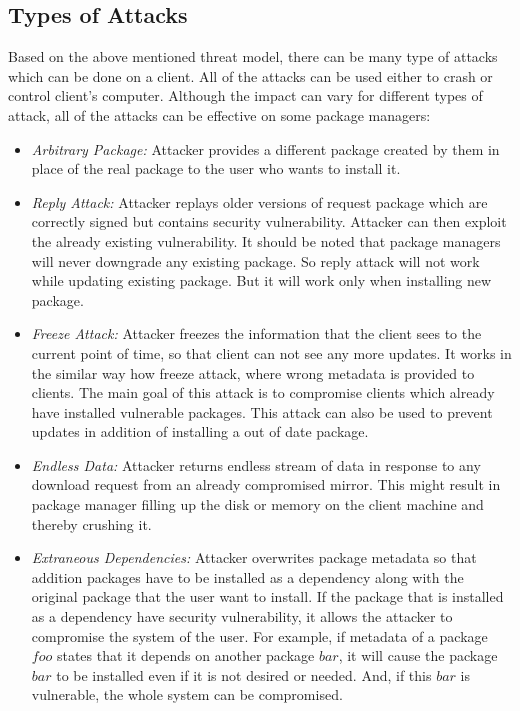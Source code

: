 \documentclass{IEEEtran}
\begin{document}
\subsection{Types of Attacks}
\label{subsec:attack-types}
Based on the above mentioned threat model, there can be many type of attacks which can be done on a client. All of the attacks can be used either to crash or control client's computer. Although the impact can vary for different types of attack, all of the attacks can be effective on some package managers:
\begin{itemize}
	\item \emph{Arbitrary Package:} Attacker provides a different package created by them in place of the real package to the user who wants to install it.
	
	\item \emph{Reply Attack:} Attacker replays older versions of request package which are correctly signed but contains security vulnerability. Attacker can then exploit the already existing vulnerability. It should be noted that package managers will never downgrade any existing package. So reply attack will not work while updating existing package. But it will work only when installing new package.
	
	\item \emph{Freeze Attack:} Attacker freezes the information that the client sees to the current point of time, so that client can not see any more updates. It works in the similar way how freeze attack, where wrong metadata is provided to clients. The main goal of this attack is to compromise clients which already have installed vulnerable packages. This attack can also be used to prevent updates in addition of installing a out of date package.
	
	\item \emph{Endless Data:} Attacker returns endless stream of data in response to any download request from an already compromised mirror. This might result in package manager filling up the disk or memory on the client machine and thereby crushing it.
	
	\item \emph{Extraneous Dependencies:} Attacker overwrites package metadata so that addition packages have to be installed as a dependency along with the original package that the user want to install. If the package that is installed as a dependency have security vulnerability, it allows the attacker to compromise the system of the user. For example, if metadata of a package $foo$ states that it depends on another package $bar$, it will cause the package $bar$ to be installed even if it is not desired or needed. And, if this $bar$ is vulnerable, the whole system can be compromised.
\end{itemize}
\end{document}
